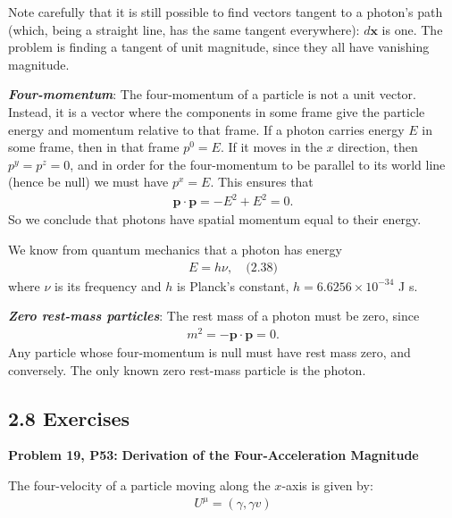 \documentclass[11pt,letterpaper]{book}
\begin{document}
        Note carefully that it is still possible to find vectors tangent to a photon’s path (which, being a straight line, has the same tangent everywhere): \( d\mathbf{x} \) is one. The problem is finding a tangent of unit magnitude, since they all have vanishing magnitude.

        \textit{\textbf{Four-momentum}}:
        The four-momentum of a particle is not a unit vector. Instead, it is a vector where the components in some frame give the particle energy and momentum relative to that frame. If a photon carries energy \( E \) in some frame, then in that frame \( p^0 = E \). If it moves in the \( x \) direction, then \( p^y = p^z = 0 \), and in order for the four-momentum to be parallel to its world line (hence be null) we must have \( p^x = E \). This ensures that
        \begin{align}
        \mathbf{p} \cdot \mathbf{p} = -E^2 + E^2 = 0.
        \end{align}
        So we conclude that photons have spatial momentum equal to their energy.
        
        We know from quantum mechanics that a photon has energy
        \begin{align}
        E = h\nu, \quad \text{(2.38)}
        \end{align}
        where \( \nu \) is its frequency and \( h \) is Planck’s constant, \( h = 6.6256 \times 10^{-34} \) J s.

        \textit{\textbf{Zero rest-mass particles}}:
        The rest mass of a photon must be zero, since
        \begin{align}
        m^2 = -\mathbf{p} \cdot \mathbf{p} = 0.
        \end{align}
        Any particle whose four-momentum is null must have rest mass zero, and conversely. The only known zero rest-mass particle is the photon.

        \subsection{2.8 Exercises}
        \textbf{Problem 19, P53:}
            \textbf{Derivation of the Four-Acceleration Magnitude}
            
            The four-velocity of a particle moving along the \( x \)-axis is given by:
            \begin{align}
            U^\mu = \left(\gamma, \gamma v\right)
            \end{align}
                    
\end{document}
